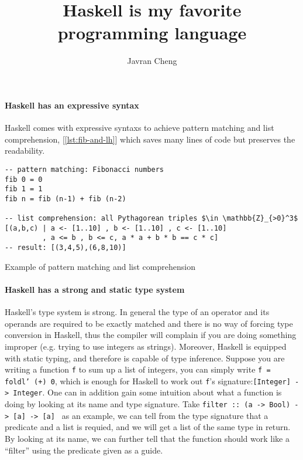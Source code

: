 \documentclass[11pt,a4paper]{article}
\title{Haskell is my favorite programming language}
\author{Javran Cheng}
\date{}
\begin{document}
\maketitle
\thispagestyle{empty}

\paragraph{Haskell has an expressive syntax}
Haskell comes with expressive syntaxs to achieve
pattern matching and list comprehension, [\ref{lst:fib-and-lh}]
which saves many lines of code but preserves the readability.

\begin{listing}
\begin{verbatim}
-- pattern matching: Fibonacci numbers
fib 0 = 0
fib 1 = 1
fib n = fib (n-1) + fib (n-2)

-- list comprehension: all Pythagorean triples $\in \mathbb{Z}_{>0}^3$
[(a,b,c) | a <- [1..10] , b <- [1..10] , c <- [1..10]
         , a <= b , b <= c, a * a + b * b == c * c]
-- result: [(3,4,5),(6,8,10)]
\end{verbatim}
\caption{Example of pattern matching and list comprehension}
\label{lst:fib-and-lh}
\end{listing}

\paragraph{Haskell has a strong and static type system}
Haskell's type system is strong. In general the type of an operator
and its operands are required to be exactly matched and 
there is no way of forcing type conversion in Haskell,
thus the compiler will complain if you are doing something improper
(e.g. trying to use integers as strings). 
Moreover, Haskell is equipped with static typing, and therefore 
is capable of type inference.
Suppose you are writing a function \texttt{f} to sum up a list of integers,
you can simply write \texttt{f = foldl' (+) 0}, which is enough for Haskell
to work out \texttt{f}'s signature:\texttt{[Integer] -> Integer}.
One can in addition gain some intuition about
what a function is doing
by looking at its name and type signature. Take
\texttt{filter :: (a -> Bool) -> [a] -> [a] }
as an example, we can tell from the type signature that
a predicate and a list is requied, and we will get a list of the 
same type in return. By looking at its name, we can further tell 
that the function should work like a ``filter''
using the predicate given as a guide.
\end{document}
